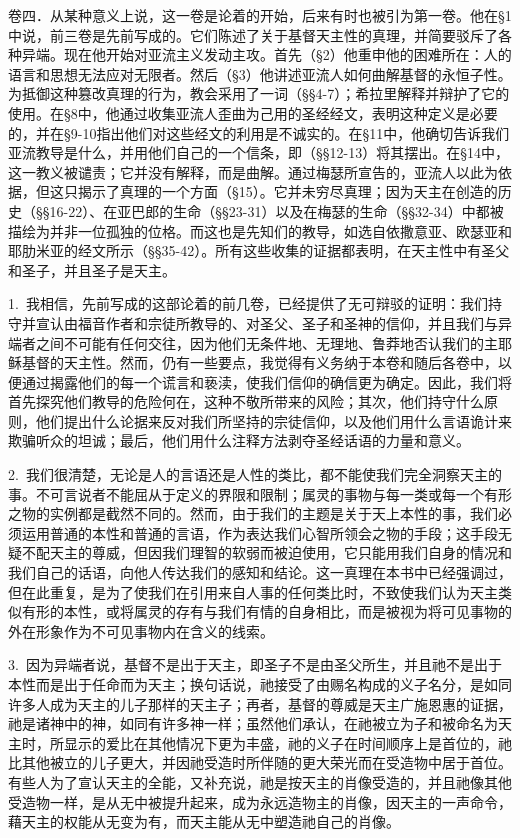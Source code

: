 卷四．从某种意义上说，这一卷是论着的开始，后来有时也被引为第一卷。他在§1中说，前三卷是先前写成的。它们陈述了关于基督天主性的真理，并简要驳斥了各种异端。现在他开始对亚流主义发动主攻。首先（§2）他重申他的困难所在：人的语言和思想无法应对无限者。然后（§3）他讲述亚流人如何曲解基督的永恒子性。为抵御这种篡改真理的行为，教会采用了一词（§§4-7）；希拉里解释并辩护了它的使用。在§8中，他通过收集亚流人歪曲为己用的圣经经文，表明这种定义是必要的，并在§9-10指出他们对这些经文的利用是不诚实的。在§11中，他确切告诉我们亚流教导是什么，并用他们自己的一个信条，即（§§12-13）将其摆出。在§14中，这一教义被谴责；它并没有解释，而是曲解。通过梅瑟所宣告的，亚流人以此为依据，但这只揭示了真理的一个方面（§15）。它并未穷尽真理；因为天主在创造的历史（§§16-22）、在亚巴郎的生命（§§23-31）以及在梅瑟的生命（§§32-34）中都被描绘为并非一位孤独的位格。而这也是先知们的教导，如选自依撒意亚、欧瑟亚和耶肋米亚的经文所示（§§35-42）。所有这些收集的证据都表明，在天主性中有圣父和圣子，并且圣子是天主。\par

1.\ 我相信，先前写成的这部论着的前几卷，已经提供了无可辩驳的证明：我们持守并宣认由福音作者和宗徒所教导的、对圣父、圣子和圣神的信仰，并且我们与异端者之间不可能有任何交往，因为他们无条件地、无理地、鲁莽地否认我们的主耶稣基督的天主性。然而，仍有一些要点，我觉得有义务纳于本卷和随后各卷中，以便通过揭露他们的每一个谎言和亵渎，使我们信仰的确信更为确定。因此，我们将首先探究他们教导的危险何在，这种不敬所带来的风险；其次，他们持守什么原则，他们提出什么论据来反对我们所坚持的宗徒信仰，以及他们用什么言语诡计来欺骗听众的坦诚；最后，他们用什么注释方法剥夺圣经话语的力量和意义。\par

2.\ 我们很清楚，无论是人的言语还是人性的类比，都不能使我们完全洞察天主的事。不可言说者不能屈从于定义的界限和限制；属灵的事物与每一类或每一个有形之物的实例都是截然不同的。然而，由于我们的主题是关于天上本性的事，我们必须运用普通的本性和普通的言语，作为表达我们心智所领会之物的手段；这手段无疑不配天主的尊威，但因我们理智的软弱而被迫使用，它只能用我们自身的情况和我们自己的话语，向他人传达我们的感知和结论。这一真理在本书中已经强调过，但在此重复，是为了使我们在引用来自人事的任何类比时，不致使我们认为天主类似有形的本性，或将属灵的存有与我们有情的自身相比，而是被视为将可见事物的外在形象作为不可见事物内在含义的线索。\par

3.\ 因为异端者说，基督不是出于天主，即圣子不是由圣父所生，并且祂不是出于本性而是出于任命而为天主；换句话说，祂接受了由赐名构成的义子名分，是如同许多人成为天主的儿子那样的天主子；再者，基督的尊威是天主广施恩惠的证据，祂是诸神中的神，如同有许多神一样；虽然他们承认，在祂被立为子和被命名为天主时，所显示的爱比在其他情况下更为丰盛，祂的义子在时间顺序上是首位的，祂比其他被立的儿子更大，并因祂受造时所伴随的更大荣光而在受造物中居于首位。有些人为了宣认天主的全能，又补充说，祂是按天主的肖像受造的，并且祂像其他受造物一样，是从无中被提升起来，成为永远造物主的肖像，因天主的一声命令，藉天主的权能从无变为有，而天主能从无中塑造祂自己的肖像。\par


